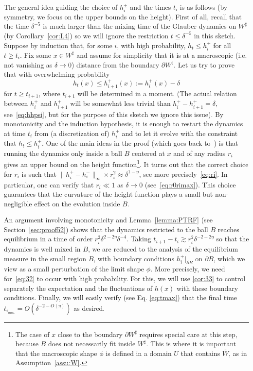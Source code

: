 \documentclass[AHL,Unicode,longabstracts,published]{cedram}
\renewcommand{\d}{{\sharp }}
\begin{document}
The general idea guiding the choice of $h^\pm_i$ and the times $t_i$ is as follows (by symmetry, we focus on the upper bounds on the height). First of all, recall that the time $ \delta^{-5}$ is much larger than the mixing time of the Glauber dynamics on $W^\d$ (by
Corollary~\ref{cor:L4}) so we will ignore the restriction $t\le \delta^{-5}$ in this sketch. Suppose by induction that, for some $i$, with high probability, $h_t \leq h_{i}^+$ for all $t \geq t_i$. Fix some $x \in W^\d$ and assume for simplicity that it is at a macroscopic (i.e. not vanishing as $\delta\to0$) distance from the boundary $\partial W^\d$. Let us try to prove that with overwhelming probability
\begin{equation}\label{eq:32}
h_t(x) \leq h^+_{{i+1}}(x):=h^+_{i}(x)-\delta
\end{equation}
for $t\ge t_{i+1}$, where $t_{i+1}$ will be determined in a moment. (The actual relation between $h^+_i$ and $h^+_{i+1}$ will be somewhat less trivial than $h^+_i-h^+_{i+1}=\delta$, see~\eqref{eq:hhpsi}, but for the purpose of this sketch we ignore this issue). By monotonicity and the induction hypothesis, it is enough to restart the dynamics at time $t_i$ from (a discretization of) $h^+_{i}$ and to let it evolve with the constraint that $h_t\le h^+_{i}$. One of the main ideas in the proof (which goes back to~\cite{CMT}) is that running the dynamics only inside a ball $B$ centered at $x$ and of any radius $r_i$ gives an upper bound on the height function\footnote{The case of $x$ close to the boundary $\partial W^\d$ requires special care at this step, because $B$ does not necessarily fit inside $W^\d$. This is where it is important that the macroscopic shape $\phi$ is defined in a domain $U$ that contains $\overline W$, as in Assumption~\ref{assu:W}.}. It turns out that the correct choice for $r_i$ is such that $\|h^+_i-h^-_i\|_\infty \times r_i^2 \approx \delta^{1- \eta}$, see more precisely~\eqref{eq:ri}. In particular, one can verify that $r_i\ll 1$ as $\delta\to0$ (see~\eqref{eq:r0rimax}). This choice guarantees that the curvature of the height function plays a small but non-negligible effect on the evolution inside $B$.

An argument involving monotonicity and Lemma~\ref{lemma:PTRF} (see Section~\ref{sec:proof52}) shows that the dynamics restricted to the ball $B$ reaches equilibrium in a time of order $ r_i^2 \delta^{2-2\eta} \delta^{-4} $. Taking $t_{i+1} - t_i\gtrsim r_i^2 \delta^{-2-2\eta}$ so that the dynamics is well mixed in $B$, we are reduced to the analysis of the equilibrium measure in the small region $B$, with boundary conditions $h^+_{i}|_{\partial B}$ on $\partial B$, which we view as a small perturbation of the limit shape $\phi$. More precisely, we need for~\eqref{eq:32} to occur with high probability. For this, we will use
\cref{cor:33} to control separately the expectation and the fluctuations of $h(x)$ with these boundary conditions. Finally, we will easily verify (see Eq. \eqref{eq:tmax}) that the final time $t_{i_{max}}=O(\delta^{-2-O(\eta)})$ as desired.
\end{document}
